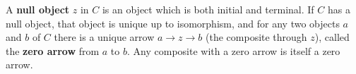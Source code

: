 A \textbf{null object} $z$ in $C$ is an object which is both initial and terminal. If $C$ has a null object, that object is unique up to isomorphism, and for any two objects $a$ and $b$ of $C$ there is a unique arrow $a \rightarrow z \rightarrow b$ (the composite through $z$), called the \textbf{zero arrow} from $a$ to $b$. Any composite with a zero arrow is itself a zero arrow.